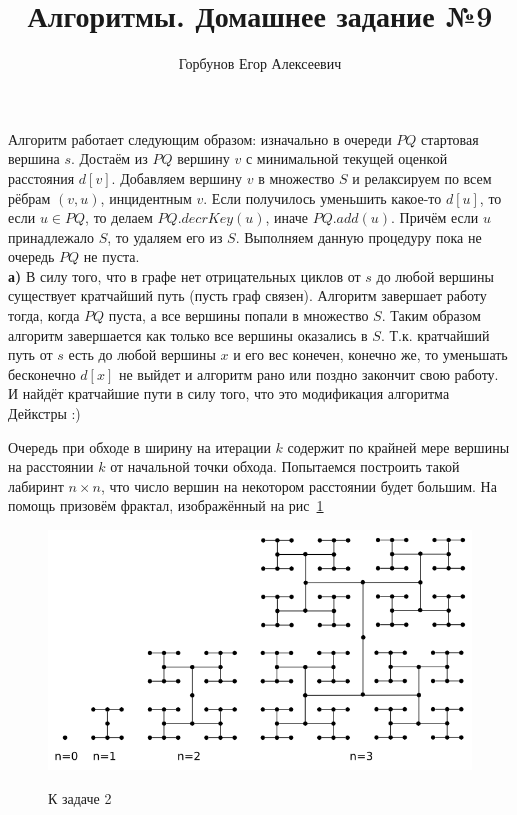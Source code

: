 
\title{Алгоритмы. Домашнее задание №9}
\author{Горбунов Егор Алексеевич}


\maketitle

Алгоритм работает следующим образом: изначально в очереди $PQ$ стартовая вершина $s$. Достаём из $PQ$ 
вершину $v$ с минимальной текущей оценкой расстояния $d[v]$. Добавляем вершину $v$ в множество $S$ и релаксируем по всем рёбрам $(v,u)$, инцидентным $v$. Если получилось уменьшить какое-то $d[u]$, то если $u \in PQ$, то делаем $PQ.decrKey(u)$, иначе $PQ.add(u)$. Причём если $u$ принадлежало $S$, то удаляем его из $S$. Выполняем данную процедуру пока не очередь $PQ$ не пуста.\\
\textbf{а)} В силу того, что в графе нет отрицательных циклов от $s$ до любой вершины существует кратчайший путь (пусть
граф связен). Алгоритм завершает работу тогда, когда $PQ$ пуста, а все вершины попали в множество $S$. Таким образом
алгоритм завершается как только все вершины оказались в $S$. Т.к. кратчайший путь от $s$ есть до любой вершины $x$ и
его вес конечен, конечно же, то уменьшать бесконечно $d[x]$ не выйдет и алгоритм рано или поздно закончит свою работу. И найдёт кратчайшие пути в силу того, что это модификация алгоритма Дейкстры :) \xqed

Очередь при обходе в ширину на итерации $k$ содержит по крайней мере вершины на расстоянии $k$ от начальной
точки обхода. Попытаемся построить такой лабиринт $n\times n$, что число вершин на некотором расстоянии будет
большим. На помощь призовём фрактал, изображённый на рис~\ref{frac}

\begin{figure}[h!]
	\caption{К задаче 2}
	\centering
	\includegraphics[scale=0.25]{hfrac}
	\label{frac}

\end{figure}

